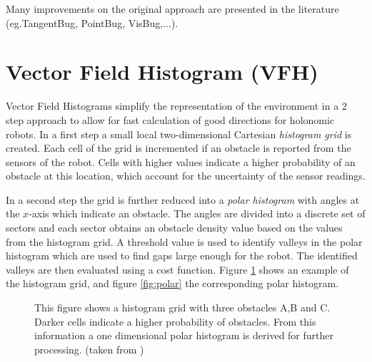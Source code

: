 Many improvements on the original approach are presented in the literature (eg.TangentBug, PointBug, VisBug,...).

\section{Vector Field Histogram (VFH)}
Vector Field Histograms \cite{borenstein1991vector} simplify the representation of the environment in a 2 step approach to allow for fast calculation of good directions for holonomic robots.
In a first step a small local two-dimensional Cartesian \emph{histogram grid} is created.
Each cell of the grid is incremented if an obstacle is reported from the sensors of the robot. 
Cells with higher values indicate a higher probability of an obstacle at this location, which account for the uncertainty of the sensor readings. 

In a second step the grid is further reduced into a \emph{polar histogram} with angles at the $x$-axis which indicate an obstacle. 
The angles are divided into a discrete set of sectors and each sector obtains an obstacle density value based on the values from the histogram grid.
A threshold value is used to identify valleys in the polar histogram which are used to find gaps large enough for the robot.
The identified valleys are then evaluated using a cost function.
Figure \ref{fig:vfh} shows an example of the histogram grid, and figure \ref{fig:polar} the corresponding polar histogram.
\begin{figure}[thpb]
	  \myfloatalign
      \footnotesize
      \centering
   \caption[Vector Field Histogram Grid.]{This figure shows a histogram grid with three obstacles A,B and C. Darker cells indicate a higher probability of obstacles. From this information a one dimensional polar histogram is derived for further processing. (taken from \cite{borenstein1991vector})}
   \label{fig:vfh}
\end{figure}


